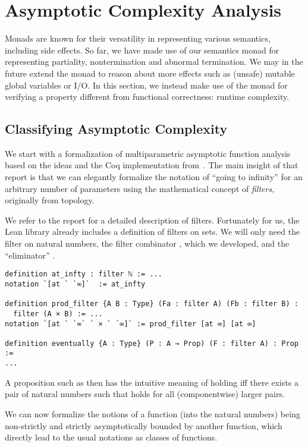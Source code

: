 \section{Asymptotic Complexity Analysis}
\label{sec:asymptotic}

Monads are known for their versatility in representing various semantics,
including side effects. So far, we have made use of our semantics monad for
representing partiality, \ie nontermination and abnormal termination. We may in
the future extend the monad to reason about more effects such as (unsafe) mutable global
variables or I/O. In this section, we instead make use of the monad for verifying a
property different from functional correctness: runtime complexity.

\subsection{Classifying Asymptotic Complexity}

We start with a formalization of multiparametric asymptotic function analysis
based on the ideas and the Coq implementation from~\cite{gueneau}. The main insight of that report is that
we can elegantly formalize the notation of ``going to infinity'' for an
arbitrary number of parameters using the mathematical concept of \emph{filters},
originally from topology.

We refer to the report for a detailed description of
filters. Fortunately for us, the Lean library already includes
a definition of filters on sets. We will only need the filter  on
natural numbers, the filter combinator , which we developed,
and the ``eliminator'' .

\begin{verbatim}
definition at_infty : filter ℕ := ...
notation `[at ` `∞]`  := at_infty

definition prod_filter {A B : Type} (Fa : filter A) (Fb : filter B) :
  filter (A × B) := ...
notation `[at ` `∞` ` × ` `∞]` := prod_filter [at ∞] [at ∞]

definition eventually {A : Type} (P : A → Prop) (F : filter A) : Prop :=
...
\end{verbatim}

A proposition such as  then has the intuitive meaning
of holding iff there exists a pair of natural numbers such that  holds
for all (componentwise) larger pairs.

We can now formalize the notions of a function (into the natural numbers) being non-strictly and strictly
asymptotically bounded by another function, which directly lead to the usual
notations as classes of functions.

